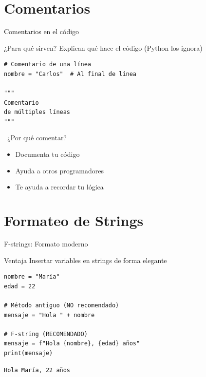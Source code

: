 \documentclass{beamer}
\begin{document}
\section{Comentarios}

\begin{frame}[fragile]{Comentarios en el código \ \faComment}

\begin{conceptbox}{¿Para qué sirven?}
Explican qué hace el código (Python los ignora)
\end{conceptbox}

\vspace{-0.2cm}
\begin{lstlisting}
# Comentario de una línea
nombre = "Carlos"  # Al final de línea

"""
Comentario
de múltiples líneas
"""
\end{lstlisting}

\vspace{-0.1cm}
\begin{block}{\faQuestionCircle \ ¿Por qué comentar?}
\small
\begin{itemize}
    \item Documenta tu código
    \item Ayuda a otros programadores
    \item Te ayuda a recordar tu lógica
\end{itemize}
\end{block}
\end{frame}

\section{Formateo de Strings}

\begin{frame}[fragile]{F-strings: Formato moderno \ \faMagic}

\begin{conceptbox}{Ventaja}
Insertar variables en strings de forma elegante
\end{conceptbox}

\vspace{-0.2cm}
\begin{lstlisting}
nombre = "María"
edad = 22

# Método antiguo (NO recomendado)
mensaje = "Hola " + nombre

# F-string (RECOMENDADO)
mensaje = f"Hola {nombre}, {edad} años"
print(mensaje)
\end{lstlisting}

\vspace{-0.2cm}
\begin{tcolorbox}[colback=green!10,colframe=green,title={\small\faArrowCircleRight \ Salida},coltitle=fg0,left=3pt,right=3pt,top=2pt,bottom=2pt]
\small\texttt{Hola María, 22 años}
\end{tcolorbox}
\end{frame}
\end{document}
